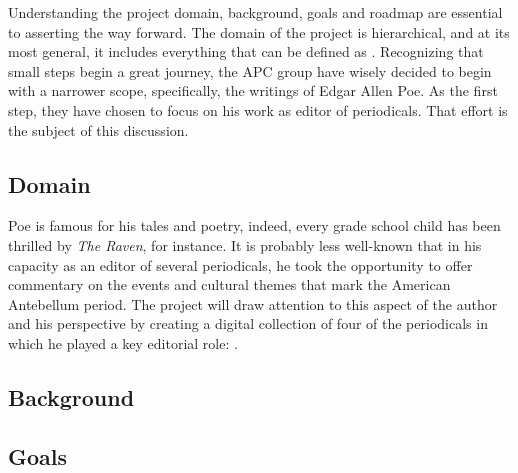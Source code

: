 Understanding the project domain, background, goals and roadmap are essential to asserting the way forward. The domain of the project is hierarchical, and at its most general, it includes everything that can be defined as \emph{\apc}. Recognizing that small steps begin a great journey, the APC group have wisely decided to begin with a narrower scope, specifically, the writings of Edgar Allen Poe. As the first step, they have chosen to focus on his work as editor of periodicals. That effort is the subject of this discussion.

\subsection{Domain}
Poe is famous for his tales and poetry, indeed, every grade school child has been thrilled by \emph{The Raven}, for instance. It is probably less well-known that in his capacity as an editor of several periodicals, he took the opportunity to offer commentary on the events and cultural themes that mark the American Antebellum period. The \projectname project will draw attention to this aspect of the author and his perspective by creating a digital collection of four of the periodicals in which he played a key editorial role: \maglist. 

\subsection{Background}


\subsection{Goals}


